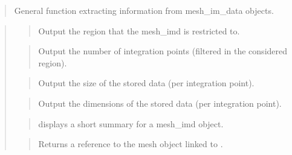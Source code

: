 \documentclass[a4paper,11pt,english]{sphinxmanual}
\begin{document}
\sphinxAtStartPar
{}
\begin{quote}

\sphinxAtStartPar
General function extracting information from mesh\_im\_data objects.
\end{quote}

\sphinxAtStartPar
{}
\begin{quote}

\sphinxAtStartPar
{}
\begin{quote}

\sphinxAtStartPar
Output the region that the mesh\_imd is restricted to.
\end{quote}

\sphinxAtStartPar
{}
\begin{quote}

\sphinxAtStartPar
Output the number of integration points (filtered in the considered region).
\end{quote}

\sphinxAtStartPar
{}
\begin{quote}

\sphinxAtStartPar
Output the size of the stored data (per integration point).
\end{quote}

\sphinxAtStartPar
{}
\begin{quote}

\sphinxAtStartPar
Output the dimensions of the stored data (per integration point).
\end{quote}

\sphinxAtStartPar
{}
\begin{quote}

\sphinxAtStartPar
displays a short summary for a mesh\_imd object.
\end{quote}

\sphinxAtStartPar
{}
\begin{quote}

\sphinxAtStartPar
Returns a reference to the mesh object linked to .
\end{quote}
\end{quote}
\end{document}
